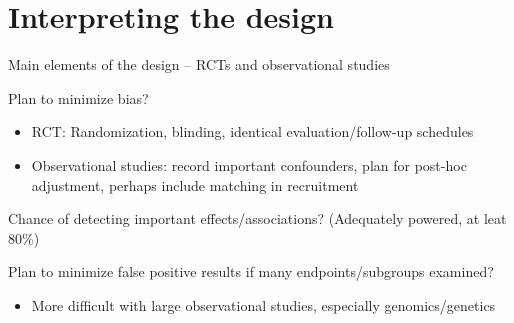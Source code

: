 \documentclass[ignorenonframetext,]{beamer}
\begin{document}
\section{Interpreting the design}\label{interpreting-the-design}

\begin{frame}{Main elements of the design -- RCTs and observational
studies}

Plan to minimize bias?

\begin{itemize}
\item
  RCT: Randomization, blinding, identical evaluation/follow-up schedules
\item
  Observational studies: record important confounders, plan for post-hoc
  adjustment, perhaps include matching in recruitment
\end{itemize}

Chance of detecting important effects/associations? (Adequately powered,
at leat 80\%) \medskip

Plan to minimize false positive results if many endpoints/subgroups
examined?

\begin{itemize}
\itemsep1pt\parskip0pt
\item
  More difficult with large observational studies, especially
  genomics/genetics
\end{itemize}

\end{frame}
\end{document}
